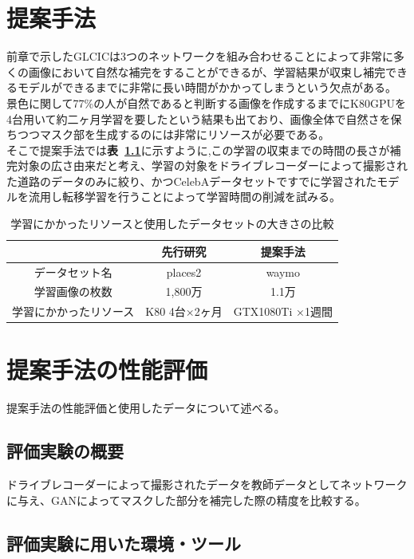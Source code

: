 \documentclass[a4j, 11pt]{jreport}
\newcommand{\tabref}[1]{\textbf{表~\ref{#1}}}
\begin{document}
\chapter{提案手法}
前章で示したGLCICは3つのネットワークを組み合わせることによって非常に多くの画像において自然な補完をすることができるが、学習結果が収束し補完できるモデルができるまでに非常に長い時間がかかってしまうという欠点がある。\\
景色に関して77\%の人が自然であると判断する画像を作成するまでにK80GPUを4台用いて約二ヶ月学習を要したという結果も出ており、画像全体で自然さを保ちつつマスク部を生成するのには非常にリソースが必要である。\\
そこで提案手法では\tabref{tb:compare_learning}に示すように,この学習の収束までの時間の長さが補完対象の広さ由来だと考え、学習の対象をドライブレコーダーによって撮影された道路のデータのみに絞り、かつCelebAデータセットですでに学習されたモデルを流用し転移学習を行うことによって学習時間の削減を試みる。
\begin{table}[H]
	\centering
	\label{tb:compare_learning}
	\caption{学習にかかったリソースと使用したデータセットの大きさの比較}
	\begin{tabular}{|c|c|c|}
	\hline
			   & 先行研究       & 提案手法           \\ \hline
	データセット名    & places2    & waymo          \\ \hline
	学習画像の枚数    & 1,800万     & 1.1万            \\ \hline
	学習にかかったリソース & K80 4台×2ヶ月 & GTX1080Ti ×1週間 \\ \hline
	\end{tabular}
	\end{table}
\chapter{提案手法の性能評価}
提案手法の性能評価と使用したデータについて述べる。
\section{評価実験の概要}
ドライブレコーダーによって撮影されたデータを教師データとしてネットワークに与え、GANによってマスクした部分を補完した際の精度を比較する。
\section{評価実験に用いた環境・ツール}
\end{document}
